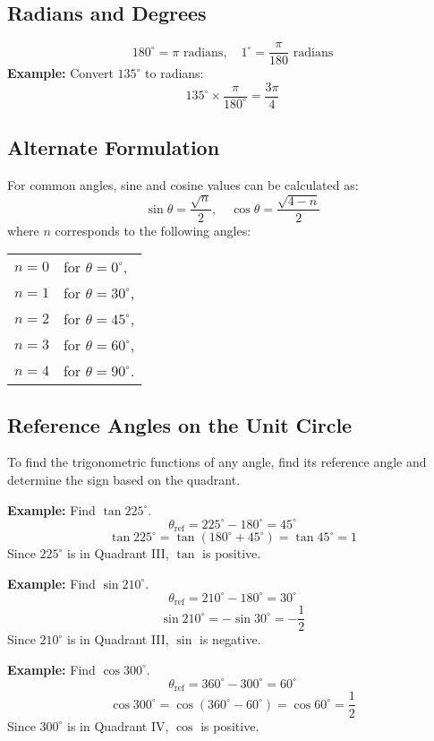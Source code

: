 \documentclass{article}
\begin{document}
\begin{multicols}{2}
\subsection*{Radians and Degrees}
\[
180^\circ = \pi \text{ radians}, \quad 1^\circ = \dfrac{\pi}{180} \text{ radians}
\]
\textbf{Example:} Convert \( 135^\circ \) to radians:
\[
135^\circ \times \dfrac{\pi}{180^\circ} = \dfrac{3\pi}{4}
\]

\subsection*{Alternate Formulation}
For common angles, sine and cosine values can be calculated as:
\[
\sin \theta = \dfrac{\sqrt{n}}{2}, \quad \cos \theta = \dfrac{\sqrt{4 - n}}{2}
\]
where \( n \) corresponds to the following angles:
\begin{center}
\begin{tabular}{ll}
\( n = 0 \) & for \( \theta = 0^\circ \), \\
\( n = 1 \) & for \( \theta = 30^\circ \), \\
\( n = 2 \) & for \( \theta = 45^\circ \), \\
\( n = 3 \) & for \( \theta = 60^\circ \), \\
\( n = 4 \) & for \( \theta = 90^\circ \). \\
\end{tabular}
\end{center}

\subsection*{Reference Angles on the Unit Circle}
To find the trigonometric functions of any angle, find its reference angle and determine the sign based on the quadrant.

\textbf{Example:} Find \(\tan 225^\circ\).
\[
\theta_{\text{ref}} = 225^\circ - 180^\circ = 45^\circ
\]
\[
\tan 225^\circ = \tan (180^\circ + 45^\circ) = \tan 45^\circ = 1
\]
Since \(225^\circ\) is in Quadrant III, \(\tan\) is positive.

\textbf{Example:} Find \(\sin 210^\circ\).
\[
\theta_{\text{ref}} = 210^\circ - 180^\circ = 30^\circ
\]
\[
\sin 210^\circ = -\sin 30^\circ = -\dfrac{1}{2}
\]
Since \(210^\circ\) is in Quadrant III, \(\sin\) is negative.

\textbf{Example:} Find \(\cos 300^\circ\).
\[
\theta_{\text{ref}} = 360^\circ - 300^\circ = 60^\circ
\]
\[
\cos 300^\circ = \cos (360^\circ - 60^\circ) = \cos 60^\circ = \dfrac{1}{2}
\]
Since \(300^\circ\) is in Quadrant IV, \(\cos\) is positive.


\end{multicols}
\end{document}

